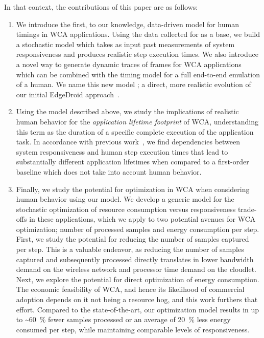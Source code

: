 In that context, the contributions of this paper are as follows:
\begin{enumerate}
    \item\label{item:contrib:model} We introduce the first, to our knowledge, data-driven model for human timings in \ac{WCA} applications.
    Using the data collected for \textcite{olguinmunoz:impact2021} as a base, we build a stochastic model which takes as input past measurements of system responsiveness and produces realistic step execution times.
    We also introduce a novel way to generate dynamic traces of frames for \ac{WCA} applications which can be combined with the timing model for a full end-to-end emulation of a human.
    We name this new model \emph{\edgedroid}; a direct, more realistic evolution of our initial EdgeDroid approach~\cite{olguin2018scaling,olguin2019edgedroid}.
    \item\label{item:contrib:footprint} Using the model described above, we study the implications of realistic human behavior for the \emph{application lifetime footprint} of \ac{WCA}, understanding this term as the duration of a specific complete execution of the application task.
    In accordance with previous work~\cite{olguinmunoz:impact2021}, we find dependencies between system responsiveness and human step execution times that lead to substantially different application lifetimes when compared to a first-order baseline which does not take into account human behavior.
    \item\label{item:contrib:optimization} Finally, we study the potential for optimization in \ac{WCA} when considering human behavior using our model.
    We develop a generic model for the stochastic optimization of resource consumption versus responsiveness trade-offs in these applications, which we apply to two potential avenues for \ac{WCA} optimization; number of processed samples and energy consumption per step.
    First, we study the potential for reducing the number of samples captured per step.
    This is a valuable endeavor, as reducing the number of samples captured and subsequently processed directly translates in lower bandwidth demand on the wireless network and processor time demand on the cloudlet.
    Next, we explore the potential for direct optimization of energy consumption.
    The economic feasibility of WCA, and hence its likelihood of commercial adoption depends on it not being a resource hog, and this work furthers that effort.
    Compared to the state-of-the-art, our optimization model results in up to \textasciitilde\SI{60}{\percent} fewer samples processed or an average of \SI{20}{\percent} less energy consumed per step, while maintaining comparable levels of responsiveness.
\end{enumerate}

